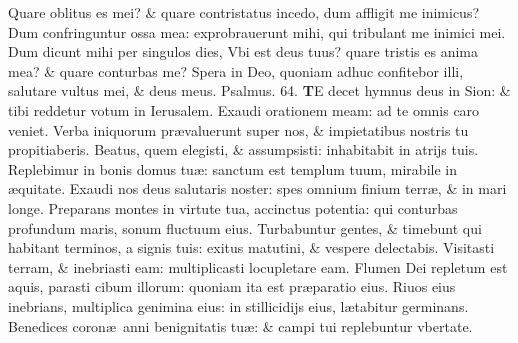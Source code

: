 \documentclass[a5paper,10pt]{book}
\def\ae{æ}
\begin{document}
\begin{multicols*}{2}
\newline \color{red} Q\color{black}uare oblitus es mei? \& quare contristatus incedo, dum affligit me inimicus?
\newline \color{red} D\color{black}um confringuntur ossa mea: exprobrauerunt mihi, qui tribulant me inimici mei.
\newline \color{red} D\color{black}um dicunt mihi per singulos dies, Vbi est deus tuus? quare tristis es anima mea? \& quare conturbas me?
\newline \color{red} S\color{black}pera in Deo, quoniam adhuc confitebor illi, salutare vultus mei, \& deus meus. \quad \color{red} Psalmus. \hypertarget{ps64}{64.} \color{black}
\vspace{-1em}
\lettrine[lines=2]{\bfseries \color{red} T}{}E decet hymnus deus in Sion: \& tibi reddetur votum in Ierusalem.
\newline \color{red} E\color{black}xaudi orationem meam: ad te omnis caro veniet.
\newline \color{red} V\color{black}erba iniquorum pr\ae valuerunt super nos, \& impietatibus nostris tu propitiaberis.
\newline \color{red} B\color{black}eatus, quem elegisti, \& assumpsisti: inhabitabit in atrijs tuis.
\newline \color{red} R\color{black}eplebimur in bonis domus tu\ae : sanctum est templum tuum, mirabile in \ae quitate.
\newline \color{red} E\color{black}xaudi nos deus salutaris noster: spes omnium finium terr\ae , \& in mari longe.
\newline \color{red} P\color{black}reparans montes in virtute tua, accinctus potentia: qui conturbas profundum maris, sonum fluctuum eius.
\newline \color{red} T\color{black}urbabuntur gentes, \& timebunt qui habitant terminos, a signis tuis: exitus matutini, \& vespere delectabis.
\newline \color{red} V\color{black}isitasti terram, \& inebriasti eam: multiplicasti locupletare eam.
\newline \color{red} F\color{black}lumen Dei repletum est aquis, parasti cibum illorum: quoniam ita est pr\ae paratio eius.
\newline \color{red} R\color{black}iuos eius inebrians, multiplica genimina eius: in stillicidijs eius, l\ae tabitur germinans.%
\newline \color{red} B\color{black}enedices coron\ae \ anni benignitatis tu\ae : \& campi tui replebuntur vbertate.

\end{multicols*}
\end{document}

